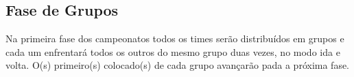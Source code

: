 \subsection{Fase de Grupos}

Na primeira fase dos campeonatos todos os times serão distribuídos em grupos e cada um enfrentará todos os outros do mesmo grupo duas vezes, no modo ida e volta. O(s) primeiro(s) colocado(s) de cada grupo avançarão pada a próxima fase.













